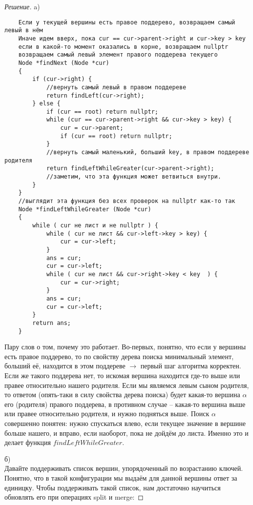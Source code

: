 \documentclass[12pt]{article}
\newenvironment{solution}[0]{\begin{proof}[Решение]}{\end{proof}}
\begin{document}
\begin{solution}
    a)
    \begin{verbatim}
    Если у текущей вершины есть правое поддерево, возвращаем самый левый в нём
    Иначе идем вверх, пока cur == cur->parent->right и cur->key > key
    если в какой-то момент оказались в корне, возвращаем nullptr
    возвращаем самый левый элемент правого поддерева текущего
    Node *findNext (Node *cur)
    {
        if (cur->right) {
            //вернуть самый левый в правом поддереве
            return findLeft(cur->right);
        } else {
            if (cur == root) return nullptr;
            while (cur == cur->parent->right && cur->key > key) {
                cur = cur->parent;
                if (cur == root) return nullptr;
            }
            //вернуть самый маленький, больший key, в правом поддереве родителя 
            return findLeftWhileGreater(cur->parent->right);
            //заметим, что эта функция может ветвиться внутри.
        }
    }
    //выглядит эта функция без всех проверок на nullptr как-то так
    Node *findLeftWhileGreater (Node *cur)
    {
        while ( cur не лист и не nullptr ) {
            while ( cur не лист && cur->left->key > key) {
                cur = cur->left;
            }
            ans = cur;
            cur = cur->left;
            while ( cur не лист && cur->right->key < key  ) {
                cur = cur->right;
            }
            ans = cur;
            cur = cur->left;
        }
        return ans;
    }
    \end{verbatim}

    Пару слов о том, почему это работает. Во-первых, понятно, что если у вершины есть правое поддерево, то
    по свойству дерева поиска минимальный элемент, больший её, находится в этом поддереве $\rightarrow$ первый
    шаг алгоритма корректен. Если же такого поддерева нет, то искомая вершина находится где-то выше или правее относительно нашего родителя.
    Если мы являемся левым сыном родителя, то ответом (опять-таки в силу свойства дерева поиска)
    будет какая-то вершина $\alpha$ его (родителя) правого поддерева, в противном случае -- какая-то вершина выше или правее относительно родителя, и нужно подняться выше.
    Поиск $\alpha$ совершенно понятен: нужно спускаться влево, если текущее значение в вершине больше нашего, и вправо, если наоборот, пока не дойдём до листа.
    Именно это и делает функция $findLeftWhileGreater$.

    б) \\Давайте поддерживать список вершин, упорядоченный по возрастанию ключей.
    Понятно, что в такой конфигурации мы выдаём для данной вершины ответ за единицку.
    Чтобы поддерживать такой список, нам достаточно научиться обновлять его при операциях split и merge:
    

\end{solution}
\end{document}
